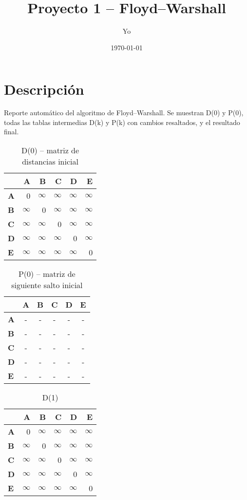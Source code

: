 \documentclass{article}
\title{Proyecto 1 – Floyd–Warshall}
\author{Yo}
\date{\today}
\newcommand{\INF}{$\infty$}
\begin{document}
\maketitle
\section*{Descripción}
Reporte automático del algoritmo de Floyd--Warshall. Se muestran D(0) y P(0), todas las tablas intermedias D(k) y P(k) con cambios resaltados, y el resultado final.

\begin{table}[H]\centering
\caption{D(0) -- matriz de distancias inicial}
\begin{tabular}{l r r r r r}
\toprule
 & \textbf{A} & \textbf{B} & \textbf{C} & \textbf{D} & \textbf{E}\\\midrule
\textbf{A} & 0 & \INF & \INF & \INF & \INF \\
\textbf{B} & \INF & 0 & \INF & \INF & \INF \\
\textbf{C} & \INF & \INF & 0 & \INF & \INF \\
\textbf{D} & \INF & \INF & \INF & 0 & \INF \\
\textbf{E} & \INF & \INF & \INF & \INF & 0 \\
\bottomrule
\end{tabular}
\end{table}

\begin{table}[H]\centering
\caption{P(0) -- matriz de siguiente salto inicial}
\begin{tabular}{l c c c c c}
\toprule
 & \textbf{A} & \textbf{B} & \textbf{C} & \textbf{D} & \textbf{E}\\\midrule
\textbf{A} & - & - & - & - & - \\
\textbf{B} & - & - & - & - & - \\
\textbf{C} & - & - & - & - & - \\
\textbf{D} & - & - & - & - & - \\
\textbf{E} & - & - & - & - & - \\
\bottomrule
\end{tabular}
\end{table}

\begin{table}[H]\centering
\caption{D(1)}
\begin{tabular}{l r r r r r}
\toprule
 & \textbf{A} & \textbf{B} & \textbf{C} & \textbf{D} & \textbf{E}\\\midrule
\textbf{A} & 0 & \INF & \INF & \INF & \INF \\
\textbf{B} & \INF & 0 & \INF & \INF & \INF \\
\textbf{C} & \INF & \INF & 0 & \INF & \INF \\
\textbf{D} & \INF & \INF & \INF & 0 & \INF \\
\textbf{E} & \INF & \INF & \INF & \INF & 0 \\
\bottomrule
\end{tabular}
\end{table}
\end{document}
